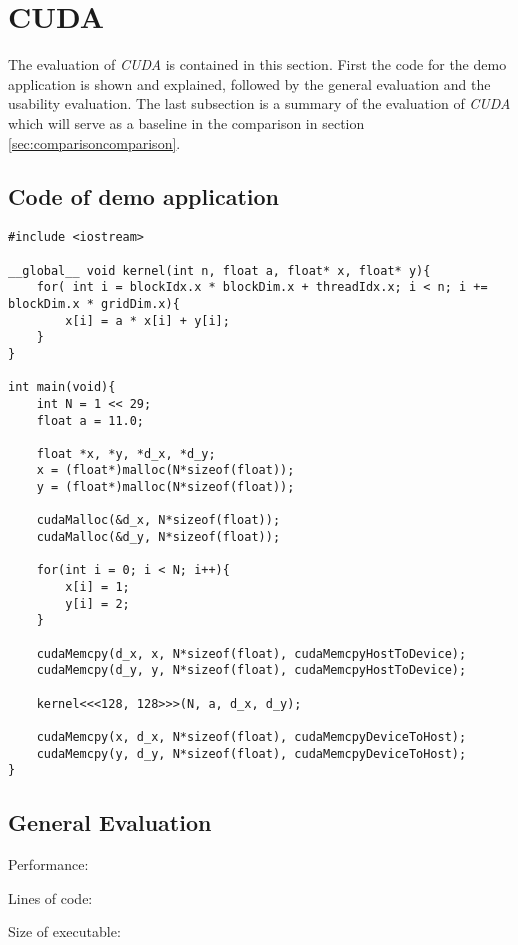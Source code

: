 \section{CUDA}
The evaluation of \textit{CUDA} is contained in this section. First the code for the demo application is shown and explained, followed by the general evaluation and the usability evaluation. The last subsection is a summary of the evaluation of \textit{CUDA} which will serve as a baseline in the comparison in section \ref{sec:comparisoncomparison}.

\subsection{Code of demo application}

\begin{lstlisting}[caption={\textit{CUDA} \textit{SAXPY} example.}, label={code:cudaSaxpy}]
#include <iostream>

__global__ void kernel(int n, float a, float* x, float* y){
    for( int i = blockIdx.x * blockDim.x + threadIdx.x; i < n; i += blockDim.x * gridDim.x){
        x[i] = a * x[i] + y[i];
    }
}

int main(void){
    int N = 1 << 29;
    float a = 11.0;

    float *x, *y, *d_x, *d_y;
    x = (float*)malloc(N*sizeof(float));
    y = (float*)malloc(N*sizeof(float));

    cudaMalloc(&d_x, N*sizeof(float));
    cudaMalloc(&d_y, N*sizeof(float));

    for(int i = 0; i < N; i++){
        x[i] = 1;
        y[i] = 2;
    }

    cudaMemcpy(d_x, x, N*sizeof(float), cudaMemcpyHostToDevice);
    cudaMemcpy(d_y, y, N*sizeof(float), cudaMemcpyHostToDevice);

    kernel<<<128, 128>>>(N, a, d_x, d_y);

    cudaMemcpy(x, d_x, N*sizeof(float), cudaMemcpyDeviceToHost);
    cudaMemcpy(y, d_y, N*sizeof(float), cudaMemcpyDeviceToHost);
}

\end{lstlisting}

\subsection{General Evaluation}

Performance: 

Lines of code: 

Size of executable: 


